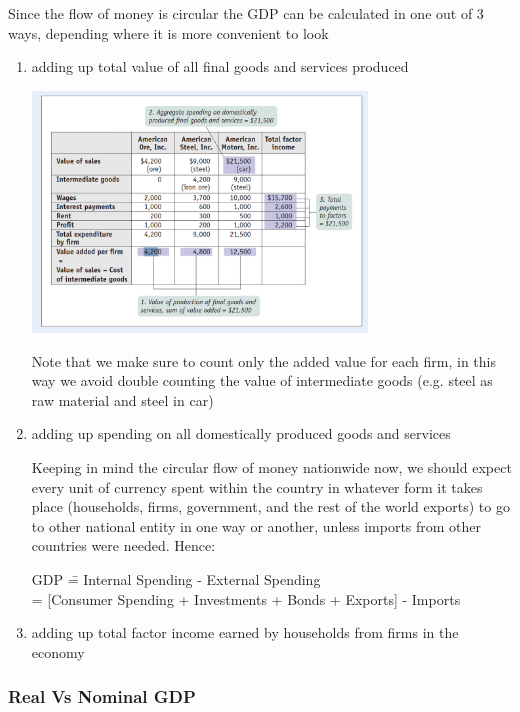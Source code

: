 \documentclass[english,course]{Notes}
\begin{document}
\par{Since the flow of money is circular the GDP can be calculated in one out of 3 ways, depending where it is more convenient to look}

\begin{enumerate}
	\item adding up total value of all final goods and services produced
	
	\includegraphics[width=0.7\textwidth]{GDP}
	
	\par{Note that we make sure to count only the added value for each firm, in this way we avoid double counting the value of intermediate goods (e.g. steel as raw material and steel in car)}
	
	\item adding up spending on all domestically produced goods and services
	
	\par{Keeping in mind the circular flow of money nationwide now, we should expect every unit of currency spent within the country in whatever form it takes place (households, firms, government, and the
rest of the world exports) to go to other national entity in one way or another, unless imports from other countries were needed. Hence:}
	
	\begin{tabbing}
  GDP  \== Internal Spending - External Spending\\
  \>= [Consumer Spending + Investments + Bonds + Exports] - Imports
  	\end{tabbing}
	
	\item adding up total factor income earned by households from firms in the economy
\end{enumerate}

\subsubsection{Real Vs Nominal GDP}
\end{document}
